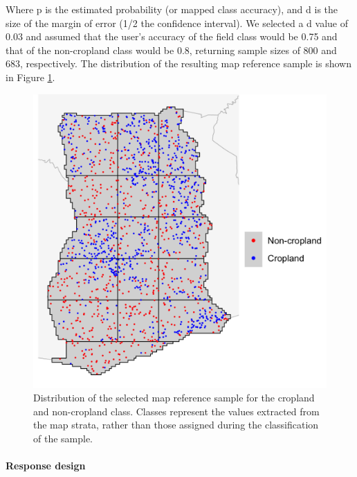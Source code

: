 \documentclass[
  11pt,
  a4paper]{article}
\begin{document}
Where p is the estimated probability (or mapped class accuracy), and d
is the size of the margin of error (1/2 the confidence interval). We
selected a d value of 0.03 and assumed that the user's accuracy of the
field class would be 0.75 and that of the non-cropland class would be
0.8, returning sample sizes of 800 and 683, respectively. The
distribution of the resulting map reference sample is shown in Figure
\ref{fig:refsample}.

\begin{figure}[!ht]

{\centering \includegraphics[width=0.8\linewidth,]{figures/si_map_reference_sample} 

}

\caption{Distribution of the selected map reference sample for the cropland and non-cropland class. Classes represent the values extracted from the map strata, rather than those assigned during the classification of the sample.}\label{fig:refsample}
\end{figure}

\hypertarget{response-design}{%
\paragraph{Response design}\label{response-design}}
\end{document}
